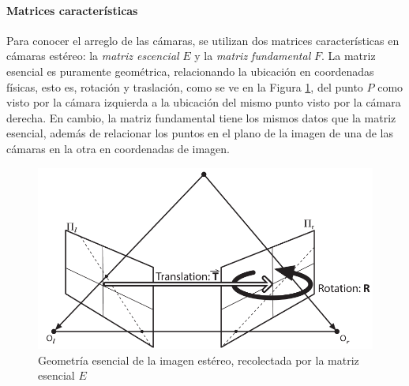 \paragraph{Matrices características}
Para conocer el arreglo de las cámaras, se utilizan dos matrices características en cámaras estéreo: la \textit{matriz escencial} $E$ y la \textit{matriz fundamental} $F$. La matriz esencial es puramente geométrica, relacionando la ubicación en coordenadas físicas, esto es, rotación y traslación, como se ve en la Figura \ref{fig:essentialgeometry}, del punto $P$ como visto por la cámara izquierda a la ubicación del mismo punto visto por la cámara derecha. En cambio, la matriz fundamental tiene los mismos datos que la matriz esencial, además de relacionar los puntos en el plano de la imagen de una de las cámaras en la otra en coordenadas de imagen.
\begin{figure}
    \centering
    \includegraphics[width=\textwidth]{Img/EssentialGeometry.png}
    \caption{Geometría esencial de la imagen estéreo, recolectada por la matriz esencial $E$}
    \label{fig:essentialgeometry}
\end{figure}

